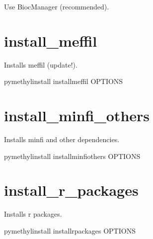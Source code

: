 \documentclass[letterpaper,10pt,english]{sphinxmanual}
\begin{document}

\begin{fulllineitems}
\label{\detokenize{index:cmdoption-pymethyl-install-install-custom-m}}
Use BiocManager (recommended).

\end{fulllineitems}



\section{install\_meffil}
\label{\detokenize{index:pymethyl-install-install-meffil}}
Installs meffil (update!).

\begin{sphinxVerbatim}[commandchars=\\\{\}]
pymethyl\PYGZhy{}install install\PYGZus{}meffil \PYG{o}{[}OPTIONS\PYG{o}{]}
\end{sphinxVerbatim}


\section{install\_minfi\_others}
\label{\detokenize{index:pymethyl-install-install-minfi-others}}
Installs minfi and other dependencies.

\begin{sphinxVerbatim}[commandchars=\\\{\}]
pymethyl\PYGZhy{}install install\PYGZus{}minfi\PYGZus{}others \PYG{o}{[}OPTIONS\PYG{o}{]}
\end{sphinxVerbatim}


\section{install\_r\_packages}
\label{\detokenize{index:pymethyl-install-install-r-packages}}
Installs r packages.

\begin{sphinxVerbatim}[commandchars=\\\{\}]
pymethyl\PYGZhy{}install install\PYGZus{}r\PYGZus{}packages \PYG{o}{[}OPTIONS\PYG{o}{]}
\end{sphinxVerbatim}
\end{document}
